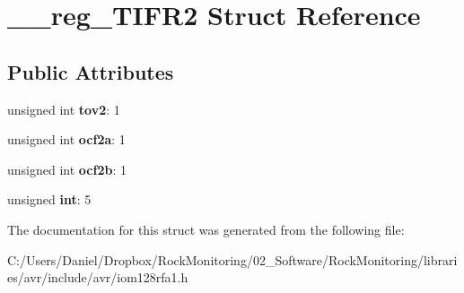 \hypertarget{struct____reg___t_i_f_r2}{}\section{\+\_\+\+\_\+reg\+\_\+\+T\+I\+F\+R2 Struct Reference}
\label{struct____reg___t_i_f_r2}
\subsection*{Public Attributes}
\begin{DoxyCompactItemize}
\item 
unsigned int {\bfseries tov2}\+: 1\hypertarget{struct____reg___t_i_f_r2_ad1328b6466730f0a3e49df2fb5722c8d}{}\label{struct____reg___t_i_f_r2_ad1328b6466730f0a3e49df2fb5722c8d}

\item 
unsigned int {\bfseries ocf2a}\+: 1\hypertarget{struct____reg___t_i_f_r2_a5c63259f51895dec32bb11079ab78879}{}\label{struct____reg___t_i_f_r2_a5c63259f51895dec32bb11079ab78879}

\item 
unsigned int {\bfseries ocf2b}\+: 1\hypertarget{struct____reg___t_i_f_r2_aecea6fab79fdac285eab21f6bb5d8378}{}\label{struct____reg___t_i_f_r2_aecea6fab79fdac285eab21f6bb5d8378}

\item 
unsigned {\bfseries int}\+: 5\hypertarget{struct____reg___t_i_f_r2_a265c3ac8eaf34506b40374bcf597180a}{}\label{struct____reg___t_i_f_r2_a265c3ac8eaf34506b40374bcf597180a}

\end{DoxyCompactItemize}


The documentation for this struct was generated from the following file\+:\begin{DoxyCompactItemize}
\item 
C\+:/\+Users/\+Daniel/\+Dropbox/\+Rock\+Monitoring/02\+\_\+\+Software/\+Rock\+Monitoring/libraries/avr/include/avr/iom128rfa1.\+h\end{DoxyCompactItemize}

